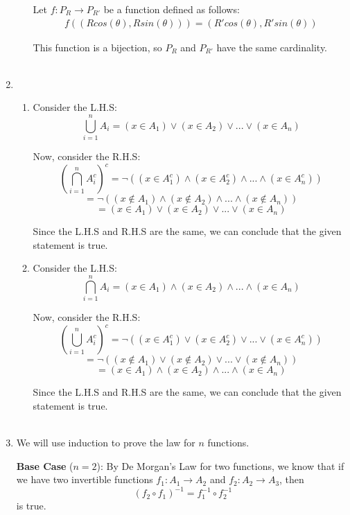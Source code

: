 \documentclass[a4paper]{article}
\begin{document}
\begin{enumerate}
\begin{enumerate}
        Let $f: P_R \rightarrow P_{R'}$ be a function defined as follows:
        \begin{align*}
            f((Rcos(\theta), Rsin(\theta))) = (R'cos(\theta), R'sin(\theta))
        \end{align*}

        This function is a bijection, so $P_R$ and $P_{R'}$ have the same cardinality.\\ \\
    \end{enumerate}

    \item \begin{enumerate}
        \item Consider the L.H.S:
        \[\bigcup_{i=1}^n A_i = (x \in A_1) \lor (x \in A_2) \lor ... \lor (x \in A_n)\]

        Now, consider the R.H.S:
        \[(\bigcap_{i=1}^{n} A_i^c)^c = \neg((x \in A_1^c) \land (x \in A_2^c) \land ... \land (x \in A_n^c))\]
        \[= \neg((x \notin A_1) \land (x \notin A_2) \land ... \land (x \notin A_n))\]
        \[= (x \in A_1) \lor (x \in A_2) \lor ... \lor (x \in A_n)\]

        Since the L.H.S and R.H.S are the same, we can conclude that the given statement is true.\\

        \newpage
        \item Consider the L.H.S:
        \[\bigcap_{i=1}^n A_i = (x \in A_1) \land (x \in A_2) \land ... \land (x \in A_n)\]

        Now, consider the R.H.S:
        \[(\bigcup_{i=1}^{n} A_i^c)^c = \neg((x \in A_1^c) \lor (x \in A_2^c) \lor ... \lor (x \in A_n^c))\]
        \[= \neg((x \notin A_1) \lor (x \notin A_2) \lor ... \lor (x \notin A_n))\]
        \[= (x \in A_1) \land (x \in A_2) \land ... \land (x \in A_n)\]

        Since the L.H.S and R.H.S are the same, we can conclude that the given statement is true.\\ \\
    \end{enumerate}

    \item We will use induction to prove the law for $n$ functions.
    
    \textbf{Base Case} (\(n = 2\)): By De Morgan's Law for two functions, we know that if we have two invertible functions \( f_1: A_1 \rightarrow A_2 \) and \( f_2: A_2 \rightarrow A_3 \), then 
    \[(f_2 \circ f_1)^{-1} = f_1^{-1} \circ f_2^{-1}\]
    is true. \\



\end{enumerate}
\end{document}
